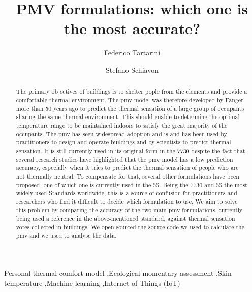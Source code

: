 
\begin{frontmatter}

    \title{PMV formulations: which one is the most accurate?}

    \author[label1]{Federico Tartarini}
    \author[label2]{Stefano Schiavon}

    \address[label1]{Berkeley Education Alliance for Research in Singapore, Singapore}
    \address[label2]{Center for the Built Environment, University of California, Berkeley, CA, USA}


    \begin{abstract}
        The primary objectives of buildings is to shelter pople from the elements and provide a comfortable thermal environment.
        The \ac{pmv} model was therefore developed by Fanger more than 50 years ago to predict the thermal sensation of a large group of occupants sharing the same thermal environment.
        This should enable to determine the optimal temperature range to be maintained indoors to satisfy the great majority of the occupants.
        The \ac{pmv} has seen widespread adoption and is and has been used by practitioners to design and operate buildings and by scientists to predict thermal sensation.
        It is still currently used in its original form in the \gls{7730} despite the fact that several research studies have highlighted that the \ac{pmv} model has a low prediction accuracy, especially when it tries to predict the thermal sensation of people who are not thermally neutral.
        To compensate for that, several other formulations have been proposed, one of which one is currently used in the \gls{55}.
        Being the \gls{7730} and \gls{55} the most widely used Standards worldwide, this is a source of confusion for practitioners and researchers who find it difficult to decide which formulation to use.
        We aim to solve this problem by comparing the accuracy of the two main \ac{pmv} formulations, currently being used a reference in the above-mentioned standard, against  thermal sensation votes collected in buildings.
         We open-sourced the source code we used to calculate the \ac{pmv} and we used to analyse the data.
    \end{abstract}

    \begin{keyword}
        Personal thermal comfort model \sep Ecological momentary assessment \sep Skin temperature \sep Machine learning \sep Internet of Things (IoT)
    \end{keyword}

\end{frontmatter}
